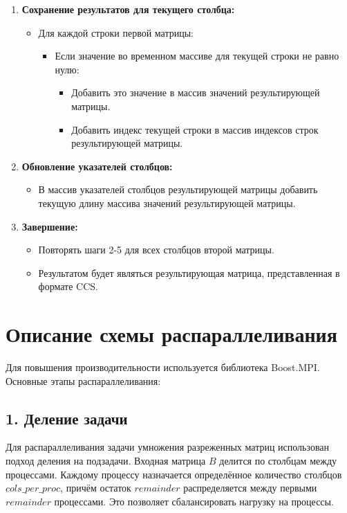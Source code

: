 \documentclass[12pt]{article}
\begin{document}
\begin{enumerate}
    \item \textbf{Сохранение результатов для текущего столбца:}
        \begin{itemize}
            \item Для каждой строки первой матрицы:
                \begin{itemize}
                   \item Если значение во временном массиве для текущей строки не равно нулю:
                    \begin{itemize}
                        \item Добавить это значение в массив значений результирующей матрицы.
                        \item Добавить индекс текущей строки в массив индексов строк результирующей матрицы.
                    \end{itemize}
                 \end{itemize}
        \end{itemize}

    \item \textbf{Обновление указателей столбцов:}
    \begin{itemize}
        \item  В массив указателей столбцов результирующей матрицы добавить текущую длину массива значений результирующей матрицы.
    \end{itemize}
    
    \item \textbf{Завершение:}
       \begin{itemize}
           \item Повторять шаги 2-5 для всех столбцов второй матрицы.
           \item Результатом будет являться результирующая матрица, представленная в формате CCS.
       \end{itemize}

\end{enumerate}
\newpage

\section*{Описание схемы распараллеливания}
Для повышения производительности используется библиотека Boost.MPI. Основные этапы распараллеливания:

\subsection*{1. Деление задачи}
Для распараллеливания задачи умножения разреженных матриц использован подход деления на подзадачи. Входная матрица \( B \) делится по столбцам между процессами. Каждому процессу назначается определённое количество столбцов \( cols\_per\_proc \), причём остаток \( remainder \) распределяется между первыми \( remainder \) процессами. Это позволяет сбалансировать нагрузку на процессы.
\end{document}
